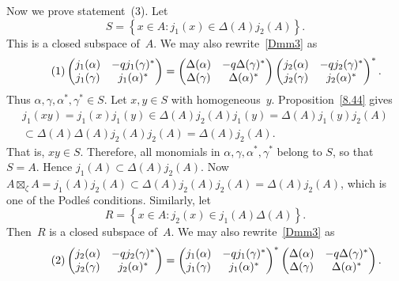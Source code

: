 \documentclass[a4paper]{amsart}
\numberwithin{equation}{section}
\theoremstyle{definition}
\theoremstyle{remark}
\begin{document}
Now we prove statement~(3).  Let
\[
S={\left\{{x\in {{A}}}:{j_{1}(x)\in\Delta({{A}})j_{2}({{A}})}\right\}}.
\]
This is a closed subspace of~${{A}}$.  We may also
rewrite~\eqref{Dmm3} as
\[
{\label{{Dmm1}}\stepcounter{equation}\tag{\theequation}}
\begin{pmatrix}
  j_{1}(\alpha)&-qj_{1}(\gamma)^{*}\\j_{1}(\gamma)&j_{1}(\alpha)^{*}
\end{pmatrix}
=
\begin{pmatrix}
  \Delta(\alpha)&-q\Delta(\gamma)^{*}\\\Delta(\gamma)&\Delta(\alpha)^{*}
\end{pmatrix}
\begin{pmatrix}
  j_{2}(\alpha)&-qj_{2}(\gamma)^{*}\\j_{2}(\gamma)&j_{2}(\alpha)^{*}
\end{pmatrix}^{*}.
\]
Thus $\alpha,\gamma,\alpha^{*},\gamma^{*}\in S$.  Let $x,y\in S$
with homogeneous~\(y\).  Proposition~\ref{8.44} gives
\begin{multline*}
  j_{1}(xy)
  =j_{1}(x)j_{1}(y)
  \in \Delta({{A}})j_{2}({{A}})j_{1}(y)
  = \Delta({{A}})j_{1}(y)j_{2}({{A}})
  \\\subset\Delta({{A}})\Delta({{A}})
  j_{2}({{A}})j_{2}({{A}})
  =\Delta({{A}})j_{2}({{A}}).
\end{multline*}
That is, $xy\in S$.  Therefore, all monomials in
$\alpha,\gamma,\alpha^{*},\gamma^{*}$ belong to $S$, so that
$S={{A}}$.  Hence $j_{1}({{A}})\subset
\Delta({{A}})j_{2}({{A}})$.  Now ${{A}}{\boxtimes}_\zeta {{A}}
= j_{1}({{A}}) j_{2}({{A}}) \subset \Delta({{A}})
j_{2}({{A}}) j_{2}({{A}}) = \Delta({{A}}) j_{2}({{A}})$,
which is one of the Podle\'s conditions.
Similarly, let
\[
R={\left\{{x\in {{A}}}:{j_{2}(x)\in j_{1}({{A}})\Delta({{A}})}\right\}}.
\]
Then~$R$ is a closed subspace of~${{A}}$.  We may also
rewrite~\eqref{Dmm3} as
\[
{\label{{Dmm2}}\stepcounter{equation}\tag{\theequation}}
\begin{pmatrix}
  j_{2}(\alpha)&-qj_{2}(\gamma)^{*}\\j_{2}(\gamma)&j_{2}(\alpha)^{*}\\
\end{pmatrix}
=
\begin{pmatrix}
  j_{1}(\alpha)&-qj_{1}(\gamma)^{*}\\j_{1}(\gamma)&j_{1}(\alpha)^{*}
\end{pmatrix}^{*}
\begin{pmatrix}
  \Delta(\alpha)&-q\Delta(\gamma)^{*}\\\Delta(\gamma)&\Delta(\alpha)^{*}
\end{pmatrix}.
\]
\end{document}
